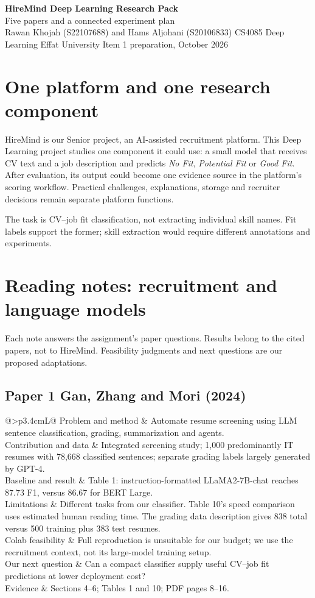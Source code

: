 \documentclass[10pt,a4paper]{article}
\makeatletter
\newcommand{\paper}[9]{%
\subsection*{#1}
\begin{tabularx}{\linewidth}{@{}>{\bfseries}p{3.4cm}L@{}}\toprule
Problem and method & #2\\
Contribution and data & #3\\
Baseline and result & #4\\
Limitations & #5\\
Colab feasibility & #6\\
Our next question & #7\\
Evidence & #8\\\bottomrule
\end{tabularx}}
\makeatother
\begin{document}
{\LARGE\bfseries\color{navy} HireMind Deep Learning Research Pack}\\[0.3em]
{\large Five papers and a connected experiment plan}\\[0.4em]
Rawan Khojah (S22107688) and Hams Aljohani (S20106833) \textbar{} CS4085 Deep Learning \textbar{} Effat University \textbar{} Item 1 preparation, October 2026

\section{One platform and one research component}
HireMind is our Senior project, an AI-assisted recruitment platform. This Deep Learning project studies one component it could use: a small model that receives CV text and a job description and predicts \emph{No Fit}, \emph{Potential Fit} or \emph{Good Fit}. After evaluation, its output could become one evidence source in the platform's scoring workflow. Practical challenges, explanations, storage and recruiter decisions remain separate platform functions.

The task is CV--job fit classification, not extracting individual skill names. Fit labels support the former; skill extraction would require different annotations and experiments.

\section{Reading notes: recruitment and language models}
Each note answers the assignment's paper questions. Results belong to the cited papers, not to HireMind. Feasibility judgments and next questions are our proposed adaptations.

\paper{Paper 1 \quad Gan, Zhang and Mori (2024)}
{Automate resume screening using LLM sentence classification, grading, summarization and agents.}
{Integrated screening study; 1,000 predominantly IT resumes with 78,668 classified sentences; separate grading labels largely generated by GPT-4.}
{Table 1: instruction-formatted LLaMA2-7B-chat reaches 87.73 F1, versus 86.67 for BERT Large.}
{Different tasks from our classifier. Table 10's speed comparison uses estimated human reading time. The grading data description gives 838 total versus 500 training plus 383 test resumes.}
{Full reproduction is unsuitable for our budget; we use the recruitment context, not its large-model training setup.}
{Can a compact classifier supply useful CV--job fit predictions at lower deployment cost?}
{Sections 4--6; Tables 1 and 10; PDF pages 8--16.}{}
\end{document}
